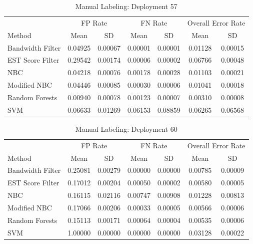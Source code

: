 \documentclass[twoside]{article}
\begin{document}
\begin{table}[H]
\caption{Manual Labeling: Deployment 57}
\centering
\begin{tabular}{lcccccc}
\toprule
\multicolumn{1}{c}{ } 
&\multicolumn{2}{c}{FP Rate } 
&\multicolumn{2}{c}{FN Rate } 
&\multicolumn{2}{c}{Overall Error Rate } \\
\cmidrule(r){2-3}
\cmidrule(r){4-5}
\cmidrule(r){6-7}
Method& Mean & SD & Mean & SD & Mean & SD \\
\midrule
Bandwidth Filter & 0.04925 & 0.00067 & 0.00001 & 0.00001 & 0.01128 & 0.00015 \\
EST Score Filter & 0.29542 & 0.00174 & 0.00006 & 0.00002 & 0.06766 & 0.00048 \\
NBC & 0.04218 & 0.00076 & 0.00178 & 0.00028 & 0.01103 & 0.00021 \\
Modified NBC  & 0.04446 & 0.00085 & 0.00030 & 0.00006 & 0.01041 & 0.00018 \\
Random Forests & 0.00940 & 0.00078 & 0.00123 & 0.00007 & 0.00310 & 0.00008 \\
SVM & 0.06633 & 0.01269 & 0.06153 & 0.08859 & 0.06265 & 0.06568 \\
\bottomrule
\end{tabular}
\end{table}

\begin{table}[H]
\caption{Manual Labeling: Deployment 60}
\centering
\begin{tabular}{lcccccc}
\toprule
\multicolumn{1}{c}{ } 
&\multicolumn{2}{c}{FP Rate } 
&\multicolumn{2}{c}{FN Rate } 
&\multicolumn{2}{c}{Overall Error Rate } \\
\cmidrule(r){2-3}
\cmidrule(r){4-5}
\cmidrule(r){6-7}
Method& Mean & SD & Mean & SD & Mean & SD \\
\midrule
Bandwidth Filter & 0.25081 & 0.00279 & 0.00000 & 0.00000 & 0.00785 & 0.00009 \\
EST Score Filter & 0.17012 & 0.00204 & 0.00050 & 0.00002 & 0.00580 & 0.00005 \\
NBC & 0.16115 & 0.02116 & 0.00747 & 0.00908 & 0.01228 & 0.00813 \\
Modified NBC & 0.17066 & 0.00206 & 0.00033 & 0.00005 & 0.00566 & 0.00006 \\
Random Forests & 0.15113 & 0.00171 & 0.00064 & 0.00004 & 0.00535 & 0.00006 \\
SVM & 1.00000 & 0.00000 & 0.00000 & 0.00000 & 0.03128 & 0.00022 \\
\bottomrule
\end{tabular}
\end{table}
\end{document}
